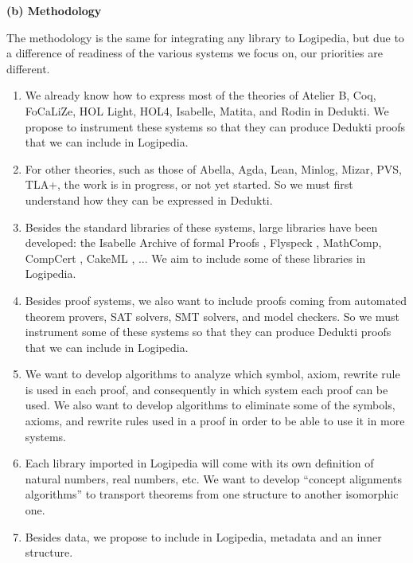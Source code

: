 {\bf (b) Methodology}

The methodology is the same for integrating any library to Logipedia,
but due to a difference of readiness of the various systems we focus on,
our priorities are different.

\begin{enumerate}
\item We already know how to express most of the theories of Atelier B,
Coq, FoCaLiZe, HOL Light, HOL4, 
Isabelle, Matita, and Rodin in  Dedukti. We propose
to instrument these systems so that they can produce Dedukti
proofs that we can include in Logipedia.

\item For other theories, such as those of Abella, Agda, Lean, Minlog,
  Mizar, PVS, TLA+, the work is in progress, or not yet started.  So
  we must first understand how they can be expressed in Dedukti.

\item Besides the standard libraries of these systems, large libraries
  have been developed: the Isabelle Archive of formal Proofs \cite{AFP},
   Flyspeck \cite{Flyspeck}, MathComp\cite{Mathcomp}, 
  CompCert \cite{Compcert},  CakeML \cite{CakeML}, ...  We aim to include
  some of these libraries in Logipedia.
  
\item
Besides proof systems, we also want to include proofs coming from
automated theorem provers, SAT solvers, SMT solvers, and model
checkers.  So we must instrument some of these systems so that they
can produce Dedukti proofs that we can include in Logipedia.

\item
We want to develop algorithms to analyze which symbol, axiom, rewrite
rule is used in each proof, and consequently in which system each proof
can be used. We also want to develop algorithms to eliminate some of the 
symbols, axioms, and rewrite rules used in a proof in order to be able to 
use it in more systems.


\item
Each library imported in Logipedia will come with its own
definition of natural numbers, real numbers, etc. We want to develop
``concept alignments algorithms'' to transport theorems from one
structure to another isomorphic one.

\item 
Besides data, we propose to include in Logipedia, metadata and
an inner structure.
\end{enumerate}

